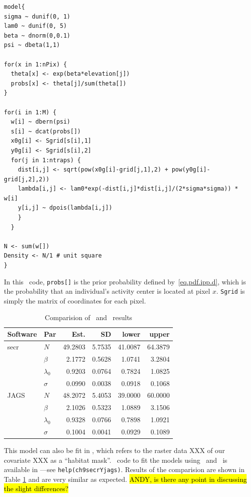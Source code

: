 \begin{small}
\begin{verbatim}
model{
sigma ~ dunif(0, 1)
lam0 ~ dunif(0, 5)
beta ~ dnorm(0,0.1)
psi ~ dbeta(1,1)

for(x in 1:nPix) {
  theta[x] <- exp(beta*elevation[j])
  probs[x] <- theta[j]/sum(theta[])
}

for(i in 1:M) {
  w[i] ~ dbern(psi)
  s[i] ~ dcat(probs[])
  x0g[i] <- Sgrid[s[i],1]
  y0g[i] <- Sgrid[s[i],2]
  for(j in 1:ntraps) {
    dist[i,j] <- sqrt(pow(x0g[i]-grid[j,1],2) + pow(y0g[i]-grid[j,2],2))
    lambda[i,j] <- lam0*exp(-dist[i,j]*dist[i,j]/(2*sigma*sigma)) * w[i]
    y[i,j] ~ dpois(lambda[i,j])
    }
  }

N <- sum(w[])
Density <- N/1 # unit square
}
\end{verbatim}
\end{small}
In this \bugs~code, \verb+probs[]+ is the prior probability defined
by~\ref{eq.pdf.ipp.d}, which is the probability that an individual's
activity center is located at pixel $x$. \verb+Sgrid+ is simply the
matrix of coordinates for each pixel.

\begin{table}[b]
\centering
\caption{Comparision of \secr~and \jags~results}
\begin{tabular}{llrrrr}
\hline
Software & Par & Est. & SD & lower & upper \\
\hline
 secr & $N$ & 49.2803 & 5.7535 & 41.0087 & 64.3879 \\
      & $\beta$ &  2.1772 & 0.5628 &  1.0741 &  3.2804 \\
      & $\lambda_0$ &  0.9203 & 0.0764 &  0.7824 &  1.0825 \\
      & $\sigma$ &  0.0990 & 0.0038 &  0.0918 &  0.1068 \\
 JAGS & $N$ & 48.2072 & 5.4053 & 39.0000 & 60.0000 \\
      & $\beta$ &  2.1026 & 0.5323 &  1.0889 &  3.1506 \\
      & $\lambda_0$ &  0.9328 & 0.0766 &  0.7898 &  1.0921 \\
      & $\sigma$ &  0.1004 & 0.0041 &  0.0929 &  0.1089 \\
\hline
\end{tabular}
\label{ch9:tab:secrYjags}
\end{table}

This model can also be fit in \secr, which refers
to the raster data XXX of our covariate XXX as a ``habitat mask''. \R~code to
fit the models using \secr~and \jags~is available in \scrbook---see
\verb#help(ch9secrYjags)#. Results of the
comparision are shown in Table \ref{ch9:tab:secrYjags} and are
very similar as expected. \hl{ANDY, is there any point in discussing
  the slight differences?}

